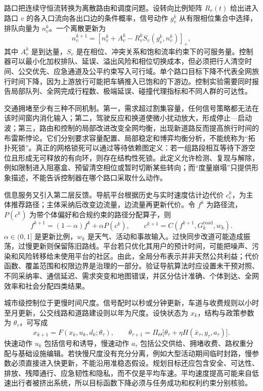 路口把连续守恒流转换为离散路由和调度问题。设转向比例矩阵 $R_v(t)$ 给出进入路口 $v$ 的各入口流向各出口边的条件概率，信号动作 $g_v^k$ 从有限相位集合中选择，排队向量为 $n_v^k$。一个离散更新为
\[
n_v^{k+1}=\left[n_v^k+A_v^k-R_v^k
S_v(g_v^k,n_v^k)\right]_+,
\]
其中 $A_v^k$ 是到达量，$S_v$ 是在相位、冲突关系和饱和流率约束下的可服务量。控制器可以最小化加权排队、延误、溢出风险和相位切换成本，但必须把行人清空时间、公交优先、应急通道及公平约束写入可行域。单个路口目标下降不代表全网旅行时间下降，因为上游放行可能把车辆推入已饱和的下游边。控制实验需要同时报告局部队列、全网完成行程数、极端延误、碰撞代理指标和不同人群的可达性。

交通拥堵至少有三种不同机制。第一，需求超过割集容量，任何信号策略都无法在该时间窗内消化输入；第二，驾驶反应和换道使微小扰动放大，形成停止—启动波；第三，路由和控制的局部改进改变全网均衡，出现新道路反而提高旅行时间的布雷斯悖论。它们分别要求容量配置、局部稳定和博弈均衡分析，不能统称为“拓扑死锁”。真正的网格锁死可以通过等待依赖图定义：若一组路段相互等待下游空位且形成无可释放的有向环，则存在结构性死锁。此定义允许检测、复现与解除，例如限制进入阻塞盒、预留清空相位或暂时切断某些转向；而“度量崩塌”只提供形象描述，不能告诉控制器在哪个路口采取什么动作。

信息服务又引入第二层反馈。导航平台根据历史与实时速度估计边代价 $c_e^k$，为主体推荐路径；主体采纳后改变边流量，边流量再更新代价。令 $f^k$ 为路径流，$P(c^k)$ 为带个体偏好和合规约束的路径分配算子，则
\[
f^{k+1}=(1-\alpha)f^k+\alpha P(c^k),
\qquad
c^{k+1}=C(f^{k+1},G_k^{\mathrm{road}},w_k).
\]
$\alpha\in(0,1]$ 是更新比例，$w_k$ 是天气、活动和事故输入。过快同步改道可能造成振荡，过慢更新则保留陈旧路线。平台若只优化其用户的预计时间，可能把噪声、污染和风险转移给未使用平台的社区。由此，全局分布表示并非天然公共利益；代价函数、覆盖范围和权限边界是治理的一部分。验证导航算法时应设置未干预对照、不同采纳率、通信延迟、需求突变和地图错误，并区分估计准确、个体到达、全网效率和社会分配四类结果。

城市级控制位于更慢时间尺度。信号配时以秒或分钟更新，车道与收费规则以小时至月更新，公交线路和道路建设则以年为尺度。设快状态为 $x_k$，结构与政策参数为 $\theta_\tau$，可写成
\[
x_{k+1}=F(x_k,u_k,d_k;\theta_\tau),
\qquad
\theta_{\tau+1}=\Pi_{\Theta}
\bigl[\theta_\tau+\eta H(\bar x_\tau,y_\tau,a_\tau)\bigr].
\]
快速动作 $u_k$ 包括信号和诱导，慢速动作 $a_\tau$ 包括公交供给、拥堵收费、路权重分配与基础设施编辑。若快慢尺度没有充分分离，例如大型活动期间临时封路，慢参数必须直接进入快更新，不能沿用准稳态假设。规划目标还应包含安全、可达性、排放、残障通行、应急韧性和隐私，而不仅是平均车速。平均速度提高可能来自低速出行者被挤出系统，所以目标函数下降必须与任务成功和权利约束分别核验。

